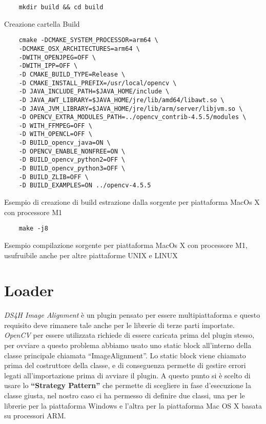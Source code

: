 \begin{listing}[H]
\begin{verbatim}
    mkdir build && cd build
\end{verbatim}
\caption{Creazione cartella Build}\label{lst:mdkdirbuild}
\end{listing}


\begin{listing}[H]
\begin{verbatim}
    cmake -DCMAKE_SYSTEM_PROCESSOR=arm64 \
    -DCMAKE_OSX_ARCHITECTURES=arm64 \
    -DWITH_OPENJPEG=OFF \
    -DWITH_IPP=OFF \
    -D CMAKE_BUILD_TYPE=Release \
    -D CMAKE_INSTALL_PREFIX=/usr/local/opencv \
    -D JAVA_INCLUDE_PATH=$JAVA_HOME/include \
    -D JAVA_AWT_LIBRARY=$JAVA_HOME/jre/lib/amd64/libawt.so \
    -D JAVA_JVM_LIBRARY=$JAVA_HOME/jre/lib/arm/server/libjvm.so \
    -D OPENCV_EXTRA_MODULES_PATH=../opencv_contrib-4.5.5/modules \
    -D WITH_FFMPEG=OFF \
    -D WITH_OPENCL=OFF \
    -D BUILD_opencv_java=ON \
    -D OPENCV_ENABLE_NONFREE=ON \
    -D BUILD_opencv_python2=OFF \
    -D BUILD_opencv_python3=OFF \
    -D BUILD_ZLIB=OFF \
    -D BUILD_EXAMPLES=ON ../opencv-4.5.5
\end{verbatim}
\caption{Esempio di creazione di build estrazione dalla sorgente per piattaforma MacOs X con processore M1}\label{lst:extract}
\end{listing}


\begin{listing}[H]
\begin{verbatim}
    make -j8
\end{verbatim}
\caption{Esempio compilazione sorgente per piattaforma MacOs X con processore M1, usufruibile anche per altre piattaforme UNIX e LINUX}\label{lst:compile}
\end{listing}

\section{Loader}
\noindent \textit{DS4H Image Alignment} è un plugin pensato per essere multipiattaforma e questo requisito deve rimanere tale anche per le librerie di terze parti importate. \textit{OpenCV} per essere utilizzata richiede di essere caricata prima del plugin stesso, per ovviare a questo problema abbiamo usato uno static block all'interno della classe principale chiamata ``ImageAlignment''. Lo static block viene chiamato prima del costruttore della classe, e di conseguenza permette di gestire errori legati all'importazione prima di avviare il plugin. A questo punto si è scelto di usare lo \textbf{``Strategy Pattern''} che permette di scegliere in fase d'esecuzione la classe giusta, nel nostro caso ci ha permesso di definire due classi, una per le librerie per la piattaforma Windows e l'altra per la piattaforma Mac OS X basata su processori ARM\@.

